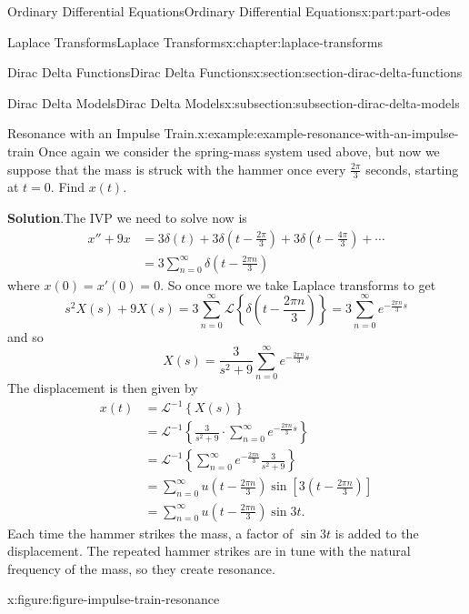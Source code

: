 \documentclass[oneside,10pt,]{book}
\newcommand{\blocktitlefont}{\relax}
\numberwithin{equation}{part}
\newcommand{\Sum}[2]{\sum_{#1}^{#2}}
\newcommand{\Laplace}[1]{\mathcal{L}\left\{#1\right\}}
\newcommand{\iLaplace}[1]{\mathcal{L}^{-1}\left\{#1\right\}}
\newcommand{\amp}{&}
\begin{document}
\begin{partptx}{Ordinary Differential Equations}{}{Ordinary Differential Equations}{}{}{x:part:part-odes}
\begin{chapterptx}{Laplace Transforms}{}{Laplace Transforms}{}{}{x:chapter:laplace-transforms}
\begin{sectionptx}{Dirac Delta Functions}{}{Dirac Delta Functions}{}{}{x:section:section-dirac-delta-functions}
\begin{subsectionptx}{Dirac Delta Models}{}{Dirac Delta Models}{}{}{x:subsection:subsection-dirac-delta-models}
\begin{example}{Resonance with an Impulse Train.}{x:example:example-resonance-with-an-impulse-train}
Once again we consider the spring-mass system used above, but now we suppose that the mass is struck with the hammer once every \(\frac{2\pi}{3}\) seconds, starting at \(t=0\). Find \(x(t)\).%
\par\smallskip%
\noindent\textbf{\blocktitlefont Solution}.\hypertarget{g:solution:idp105548781622304}{}\quad{}The IVP we need to solve now is%
\begin{align*}
x''+9x \amp= 3\delta(t)+3\delta(t-\frac{2\pi}{3}) + 3\delta(t-\frac{4\pi}{3}) +\cdots\\
\amp= 3\Sum{n=0}{\infty}\delta(t-\frac{2\pi n}{3})
\end{align*}
where \(x(0) = x'(0) = 0\). So once more we take Laplace transforms to get%
\begin{equation*}
s^{2}X(s)+9X(s) = 3\Sum{n=0}{\infty}\Laplace{\delta(t-\frac{2\pi n}{3})} = 3\Sum{n=0}{\infty}e^{-\frac{2\pi n}{3}s}
\end{equation*}
and so%
\begin{equation*}
X(s) = \frac{3}{s^{2}+9}\Sum{n=0}{\infty}e^{-\frac{2\pi n}{3}s}
\end{equation*}
The displacement is then given by%
\begin{align*}
x(t) \amp= \iLaplace{X(s)}\\
\amp= \iLaplace{\frac{3}{s^{2}+9}\cdot\Sum{n=0}{\infty}e^{-\frac{2\pi n}{3}s}}\\
\amp= \iLaplace{\Sum{n=0}{\infty}e^{-\frac{2\pi n}{3}}\frac{3}{s^{2}+9}}\\
\amp= \Sum{n=0}{\infty}u(t-\frac{2\pi n}{3})\sin[3(t-\frac{2\pi n}{3})]\\
\amp= \Sum{n=0}{\infty}u(t-\frac{2\pi n}{3})\sin3t\text{.}
\end{align*}
Each time the hammer strikes the mass, a factor of \(\sin3t\) is added to the displacement. The repeated hammer strikes are in tune with the natural frequency of the mass, so they create resonance.%
\end{example}
\begin{figureptx}{}{x:figure:figure-impulse-train-resonance}{}%
\begin{image}{0}{1}{0}%
\end{image}
\end{figureptx}
\end{subsectionptx}
\end{sectionptx}
\end{chapterptx}
\end{partptx}
\end{document}
